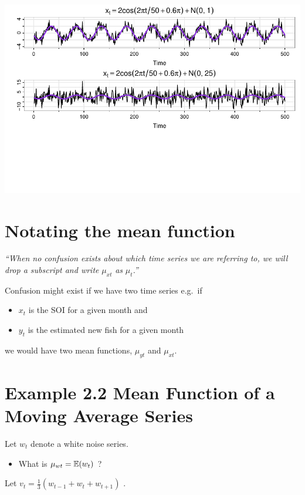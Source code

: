 \documentclass[
  letterpaper,
  DIV=11,
  numbers=noendperiod]{scrreprt}
\providecommand{\tightlist}{%
  \setlength{\itemsep}{0pt}\setlength{\parskip}{0pt}}\usepackage{longtable,booktabs,array}
\begin{document}
\includegraphics{LectureNotes/Lecture2_files/figure-pdf/unnamed-chunk-11-1.pdf}

\section{Notating the mean function}\label{notating-the-mean-function}

\emph{``When no confusion exists about which time series we are
referring to, we will drop a subscript and write} \(\mu_{xt}\) \emph{as}
\(\mu_t\)\emph{.''}

Confusion might exist if we have two time series e.g.~if

\begin{itemize}
\item
  \(x_t\) is the SOI for a given month and
\item
  \(y_t\) is the estimated new fish for a given month
\end{itemize}

we would have two mean functions, \(\mu_{yt}\) and \(\mu_{xt}\).

\section{Example 2.2 Mean Function of a Moving Average
Series}\label{example-2.2-mean-function-of-a-moving-average-series}

Let \(w_t\) denote a white noise series.

\begin{itemize}
\tightlist
\item
  What is \(\mu_{wt} = {\mathbb{E}}(w_t)\) ?
\end{itemize}

Let \(v_t = \frac{1}{3}(w_{t-1} + w_{t} + w_{t+1})\) .
\end{document}
